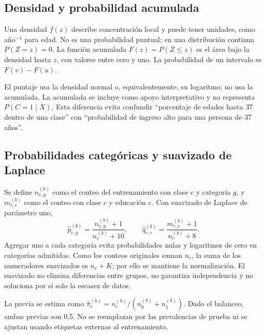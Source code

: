 \documentclass[11pt,a4paper]{article}
\begin{document}
\subsection{Densidad y probabilidad acumulada}
Una densidad $f(z)$ describe concentración local y puede tener unidades, como año$^{-1}$ para edad. No es una probabilidad puntual; en una distribución continua $P(Z=z)=0$. La función acumulada $F(z)=P(Z\leq z)$ es el área bajo la densidad hasta $z$, con valores entre cero y uno. La probabilidad de un intervalo es $F(v)-F(u)$.

El puntaje usa la densidad normal o, equivalentemente, su logaritmo; no usa la acumulada. La acumulada se incluye como apoyo interpretativo y no representa $P(C=1\mid X)$. Esta diferencia evita confundir ``porcentaje de edades hasta 37 dentro de una clase'' con ``probabilidad de ingreso alto para una persona de 37 años''.

\subsection{Probabilidades categóricas y suavizado de Laplace}
Se define $n_{c,g}^{(b)}$ como el conteo del entrenamiento con clase $c$ y categoría $g$, y $m_{c,e}^{(b)}$ como el conteo con clase $c$ y educación $e$. Con suavizado de Laplace de parámetro uno,
\begin{equation}\label{eq:laplace}
\widehat p_{c,g}^{(b)}=\frac{n_{c,g}^{(b)}+1}{n_c^{(b)}+10},\qquad
\widehat q_{c,e}^{(b)}=\frac{m_{c,e}^{(b)}+1}{n_c^{(b)}+8}.
\end{equation}
Agregar uno a cada categoría evita probabilidades nulas y logaritmos de cero en categorías admitidas. Como los conteos originales suman $n_c$, la suma de los numeradores suavizados es $n_c+K$; por ello se mantiene la normalización. El suavizado no elimina diferencias entre grupos, no garantiza independencia y no soluciona por sí solo la escasez de datos.

La previa se estima como $\widehat\pi_c^{(b)}=n_c^{(b)}/(n_0^{(b)}+n_1^{(b)})$. Dado el balanceo, ambas previas son 0,5. No se reemplazan por las prevalencias de prueba ni se ajustan usando etiquetas externas al entrenamiento.
\end{document}
